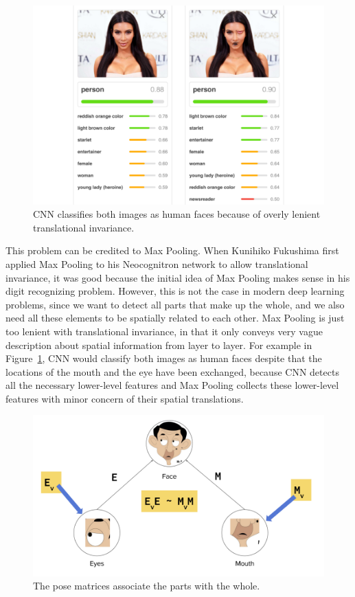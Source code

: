 \documentclass{article}
\begin{document}
\begin{figure}[!htb]
	\centering\includegraphics[width=\textwidth]{fig//maxpooling}
	\caption{CNN classifies both images as human faces because of overly lenient translational invariance.\protect\footnotemark }\label{fig:maxpooling}
\end{figure}


This problem can be credited to Max Pooling. When Kunihiko Fukushima first applied Max Pooling to his Neocognitron network\cite{fukushima1983neocognitron} to allow translational invariance, it was good because the initial idea of Max Pooling makes sense in his digit recognizing problem. However, this is not the case in modern deep learning problems, since we want to detect all parts that make up the whole, and we also need all these elements to be spatially related to each other. Max Pooling is just too lenient with translational invariance, in that it only conveys very vague description about spatial information from layer to layer. For example in Figure~\ref{fig:maxpooling}, CNN would classify both images as human faces despite that the locations of the mouth and the eye have been exchanged, because CNN detects all the necessary lower-level features and Max Pooling collects these lower-level features with minor concern of their spatial translations. 

\begin{figure}[!htb]
	\centering\includegraphics[width=.8\textwidth]{fig//partwhole}
	\caption{The pose matrices associate the parts with the whole.\protect\footnotemark }\label{fig:partwhole}
\end{figure}
\end{document}
